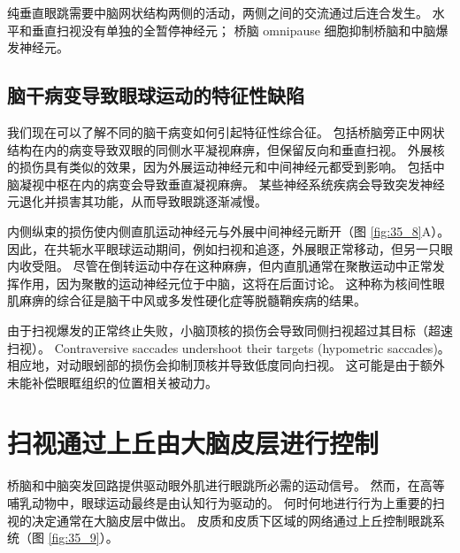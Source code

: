 纯垂直眼跳需要中脑网状结构两侧的活动，两侧之间的交流通过后连合发生。 水平和垂直扫视没有单独的全暂停神经元； 桥脑 omnipause 细胞抑制桥脑和中脑爆发神经元。

\subsection{脑干病变导致眼球运动的特征性缺陷}
我们现在可以了解不同的脑干病变如何引起特征性综合征。 包括桥脑旁正中网状结构在内的病变导致双眼的同侧水平凝视麻痹，但保留反向和垂直扫视。 外展核的损伤具有类似的效果，因为外展运动神经元和中间神经元都受到影响。 包括中脑凝视中枢在内的病变会导致垂直凝视麻痹。 某些神经系统疾病会导致突发神经元退化并损害其功能，从而导致眼跳逐渐减慢。

内侧纵束的损伤使内侧直肌运动神经元与外展中间神经元断开（图 \ref{fig:35_8}A）。 因此，在共轭水平眼球运动期间，例如扫视和追逐，外展眼正常移动，但另一只眼内收受阻。 尽管在倒转运动中存在这种麻痹，但内直肌通常在聚散运动中正常发挥作用，因为聚散的运动神经元位于中脑，这将在后面讨论。 这种称为核间性眼肌麻痹的综合征是脑干中风或多发性硬化症等脱髓鞘疾病的结果。

由于扫视爆发的正常终止失败，小脑顶核的损伤会导致同侧扫视超过其目标（超速扫视）。 Contraversive saccades undershoot their targets (hypometric saccades)。 相应地，对动眼蚓部的损伤会抑制顶核并导致低度同向扫视。 这可能是由于额外未能补偿眼眶组织的位置相关被动力。


\section{扫视通过上丘由大脑皮层进行控制}
桥脑和中脑突发回路提供驱动眼外肌进行眼跳所必需的运动信号。 然而，在高等哺乳动物中，眼球运动最终是由认知行为驱动的。 何时何地进行行为上重要的扫视的决定通常在大脑皮层中做出。 
皮质和皮质下区域的网络通过上丘控制眼跳系统（图 \ref{fig:35_9}）。

